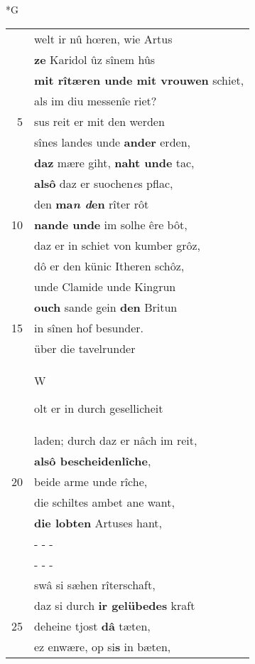 \documentclass[8pt,a4paper,notitlepage]{article}
\begin{document}
\newpage
\begin{table}[ht]
\begin{minipage}[t]{0.5\linewidth}
\small
\begin{center}*G
\end{center}
\begin{tabular}{rl}
 & welt ir nû hœren, wie Artus\\ 
 & \textbf{ze} Karidol ûz sînem hûs\\ 
 & \textbf{mit rîtæren unde mit vrouwen} schiet,\\ 
 & als im diu messenîe riet?\\ 
5 & sus reit er mit den werden\\ 
 & sînes landes unde \textbf{ander} erden,\\ 
 & \textbf{daz} mære giht, \textbf{naht unde} tac,\\ 
 & \textbf{alsô} daz er suochen\textit{e}s pflac,\\ 
 & den \textbf{ma\textit{n d}en} rîter rôt\\ 
10 & \textbf{nande unde} im solhe êre bôt,\\ 
 & daz er in schiet von kumber grôz,\\ 
 & dô er den künic Itheren schôz,\\ 
 & unde Clamide unde Kingrun\\ 
 & \textbf{ouch} sande gein \textbf{den} Britun\\ 
15 & in sînen hof besunder.\\ 
 & über die tavelrunder\\ 
 & \begin{large}W\end{large}olt er in durch gesellicheit\\ 
 & laden; durch daz er nâch im reit,\\ 
 & \textbf{alsô bescheidenlîche},\\ 
20 & beide arme unde rîche,\\ 
 & die schiltes ambet ane want,\\ 
 & \textbf{die lobten} Artuses hant,\\ 
 & \multicolumn{1}{l}{ - - - }\\ 
 & \multicolumn{1}{l}{ - - - }\\ 
 & swâ si sæhen rîterschaft,\\ 
 & daz si durch \textbf{ir gelübedes} kraft\\ 
25 & deheine tjost \textbf{dâ} tæten,\\ 
 & ez enwære, op si\textbf{s} in bæten,\\ 

\end{tabular}
\end{minipage}
\end{table}
\end{document}
